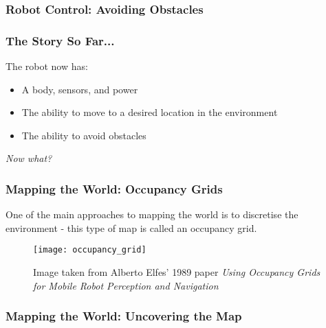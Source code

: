 \documentclass[aspectratio=169]{beamer}
\begin{document}

\begin{frame}
\frametitle{Robot Control: Avoiding Obstacles}
\begin{center}
\end{center}
\end{frame}


\begin{frame}
\frametitle{The Story So Far...}
The robot now has:\\
\begin{itemize}
\item A body, sensors, and power
\vspace{0.25cm}
\item The ability to move to a desired location in the environment
\vspace{0.25cm}
\item The ability to avoid obstacles
\end{itemize}
\vspace{1cm}
\begin{center}
\huge\textit{Now what?}
\end{center}
\end{frame}


\begin{frame}
\frametitle{Mapping the World: Occupancy Grids}
One of the main approaches to mapping the world is to discretise the environment - this type of map is called an occupancy grid.
\begin{figure}
\centering
\texttt{[image: occupancy\_grid]}
\caption{Image taken from Alberto Elfes’ 1989 paper \textit{Using Occupancy Grids for Mobile Robot Perception and Navigation}}
\end{figure}
\end{frame}


\begin{frame}
\frametitle{Mapping the World: Uncovering the Map}
\begin{center}
\end{center}
\end{frame}
\end{document}
